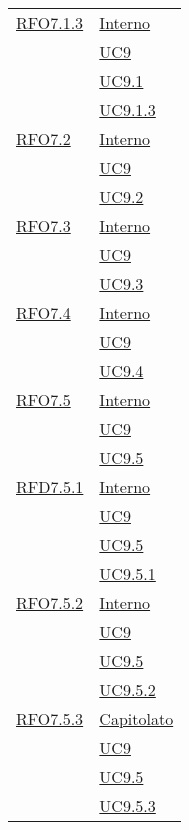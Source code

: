 \begin{longtable}{|>{\centering}m{5cm}|m{5cm}<{\centering}|}
   \hyperlink{RFO7.1.3}{RFO7.1.3} 
   & \hyperlink{Interno}{Interno}\\
   & \hyperref[UC9]{UC9}\\
   & \hyperref[UC9.1]{UC9.1}\\
   & \hyperref[UC9.1.3]{UC9.1.3}\\\hline
   
   \hyperlink{RFO7.2}{RFO7.2} 
   & \hyperlink{Interno}{Interno}\\
   & \hyperref[UC9]{UC9}\\
   & \hyperref[UC9.2]{UC9.2}\\\hline
   
    \hyperlink{RFO7.3}{RFO7.3} 
    & \hyperlink{Interno}{Interno}\\
   & \hyperref[UC9]{UC9}\\
   & \hyperref[UC9.3]{UC9.3}\\\hline
   
   \hyperlink{RFO7.4}{RFO7.4} 
   & \hyperlink{Interno}{Interno}\\
   & \hyperref[UC9]{UC9}\\
   & \hyperref[UC9.4]{UC9.4}\\\hline
   
   \hyperlink{RFO7.5}{RFO7.5} 
   & \hyperlink{Interno}{Interno}\\
   & \hyperref[UC9]{UC9}\\
   & \hyperref[UC9.5]{UC9.5}\\\hline
   
   \hyperlink{RFD7.5.1}{RFD7.5.1} 
   & \hyperlink{Interno}{Interno}\\
   & \hyperref[UC9]{UC9}\\
   & \hyperref[UC9.5]{UC9.5}\\
   & \hyperref[UC9.5.1]{UC9.5.1}\\\hline
   
   \hyperlink{RFO7.5.2}{RFO7.5.2} 
   & \hyperlink{Interno}{Interno}\\
   & \hyperref[UC9]{UC9}\\
   & \hyperref[UC9.5]{UC9.5}\\
   & \hyperref[UC9.5.2]{UC9.5.2}\\\hline
   
   \hyperlink{RFO7.5.3}{RFO7.5.3} 
   & \hyperlink{Capitolato}{Capitolato}\\
   & \hyperref[UC9]{UC9}\\
   & \hyperref[UC9.5]{UC9.5}\\
   & \hyperref[UC9.5.3]{UC9.5.3}\\\hline
   

\end{longtable}
